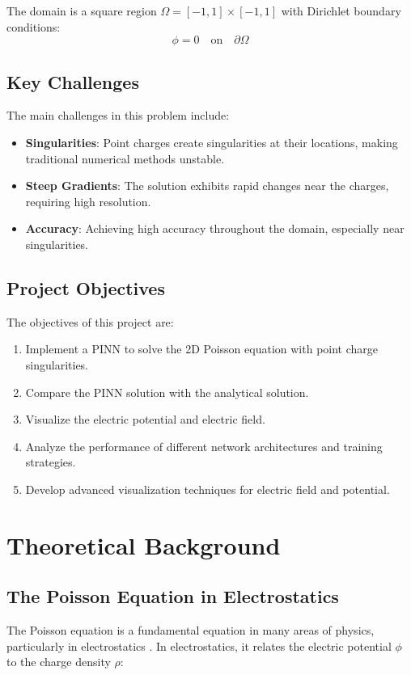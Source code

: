 \documentclass[12pt,a4paper]{report}
\begin{document}
	The domain is a square region $\Omega = [-1, 1] \times [-1, 1]$ with Dirichlet boundary conditions:
	\begin{equation}
		\phi = 0 \quad \text{on} \quad \partial\Omega
	\end{equation}
	
	\section{Key Challenges}
	The main challenges in this problem include:
	\begin{itemize}
		\item \textbf{Singularities}: Point charges create singularities at their locations, making traditional numerical methods unstable.
		\item \textbf{Steep Gradients}: The solution exhibits rapid changes near the charges, requiring high resolution.
		\item \textbf{Accuracy}: Achieving high accuracy throughout the domain, especially near singularities.
	\end{itemize}
	
	\section{Project Objectives}
	The objectives of this project are:
	\begin{enumerate}
		\item Implement a PINN to solve the 2D Poisson equation with point charge singularities.
		\item Compare the PINN solution with the analytical solution.
		\item Visualize the electric potential and electric field.
		\item Analyze the performance of different network architectures and training strategies.
		\item Develop advanced visualization techniques for electric field and potential.
	\end{enumerate}
	
	\chapter{Theoretical Background}
	
	\section{The Poisson Equation in Electrostatics}
	The Poisson equation is a fundamental equation in many areas of physics, particularly in electrostatics \cite{evans2010partial}. In electrostatics, it relates the electric potential $\phi$ to the charge density $\rho$:
	
\end{document}
